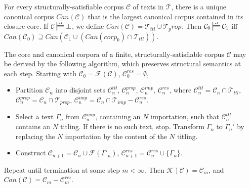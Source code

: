 \documentclass{IOS-Book-Article}
\newcommand{\corp}{ \mathcal{C} }
\newcommand{\texts}{ \mathcal{T} }
\newcommand{\ttl}{\mathit{ttl}}
\newcommand{\Formal}{\mathcal{F}}
\newcommand{\Core}{\mathcal{K}}
\newcommand{\Canon}{\mathit{Can}}
\newcommand{\prop}{\mathit{prop}}
\newcommand{\imp}{\mathit{imp}}
\newcommand{\res}{\mathit{res}}
\newcommand{\mdpfstruct}{\ensuremath{\sdtstile[ss]{}{st}}}
\begin{document}
\begin{theo}
\label{canon}
For every structurally-satisfiable corpus $\corp$ of texts in $\texts$, there is a unique canonical corpus $\Canon(\corp)$ that is the largest canonical corpus contained in its closure core. If $\corp\mdpfstruct\bot$, we define $\Canon(\corp) = \texts_\ttl \cup \texts_prop$.
Then $\corp_0\mdpfstruct\corp_1$ iff $\Canon(\corp_0) \supseteq \Canon(\corp_1\cup (\Canon(corp_0)\cap \texts_\ttl))$.
\end{theo}

\begin{theo}
\label{canonalgo}
The core and canonical corpora of a finite, structurally-satisfiable corpus $\corp$ may be derived by the following algorithm, which preserves structural semantics at each step. Starting with $\corp_0 = \Formal(\corp)$, $\corp^\res_0 = \emptyset$,
\begin{itemize}
\item Partition $\corp_n$ into disjoint sets $\corp^\ttl_n$, $\corp^\prop_n$, $\corp^\imp_n$, $\corp^\res_n$, where   $\corp^\ttl_n = \corp_n \cap \texts_\ttl$, $\corp^\prop_n = \corp_n \cap \texts_\prop$, $\corp^\imp_n = \corp_n \cap \texts_\imp - \corp^{res}_n$. 
\item Select a text $\Gamma_n$ from $\corp^\imp_n$, containing an $N$ importation, such that $\corp^\ttl_n$ contains an $N$ titling. If there is no such text, stop. Transform $\Gamma_n$ to $\Gamma_n'$ by replacing the $N$ importation by the content of the $N$ titling.
\item Construct $\corp_{n+1} = \corp_n \cup \Formal(\Gamma'_n)$, $\corp^{res}_{n+1} = \corp^{res}_{n} \cup \{\Gamma_n\}$.
\end{itemize}
Repeat until termination at some step $m < \infty$. 
Then $\Core(\corp) = \corp_m$, and $\Canon(\corp) = \corp_m - \corp^\res_m$.
\end{theo}
\end{document}
